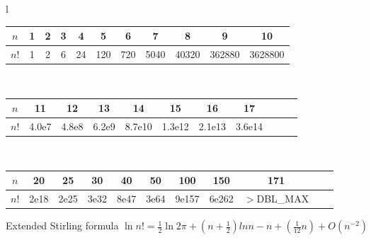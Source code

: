 \begin{center}
\begin{tabular}{l}
\begin{tabular}{c|c@{\ }c@{\ }c@{\ }c@{\ }c@{\ }c@{\ }c@{\ }c@{\ }c@{\ }c}
$n$  & 1 & 2 & 3 & 4  & 5   & 6   & 7    & 8     & 9      & 10\\
\hline
$n!$ & 1 & 2 & 6 & 24 & 120 & 720 & 5040 & 40320 & 362880 & 3628800\\
\end{tabular}\\
\begin{tabular}{c|c@{\ }c@{\ }c@{\ }c@{\ }c@{\ }c@{\ }c@{\ }c@{\ }c@{\ }c}
$n$  & 11    & 12    & 13    & 14     & 15     & 16     & 17\\
\hline
$n!$ & 4.0e7 & 4.8e8 & 6.2e9 & 8.7e10 & 1.3e12 & 2.1e13 & 3.6e14\\
\end{tabular}\\
\begin{tabular}{c|c@{\ }c@{\ }c@{\ }c@{\ }c@{\ }c@{\ }c@{\ }c@{\ }c@{\ }c}
$n$  & 20   & 25   & 30   & 40   & 50   & 100   & 150   & 171\\
\hline
$n!$ & 2e18 & 2e25 & 3e32 & 8e47 & 3e64 & 9e157 & 6e262 & \scriptsize{$>$DBL\_MAX}\\
\end{tabular}
\end{tabular}
\end{center}

Extended Stirling formula $\ln{}n!=\frac{1}{2}\ln{}2\pi + (n+\frac{1}{2})ln{} n - n + (\frac{1}{12}n) + O(n^{-2})$